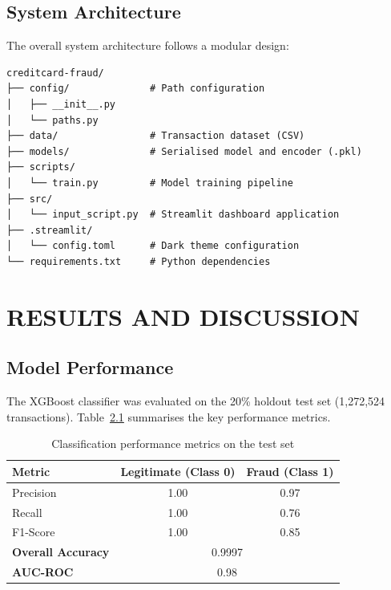 \documentclass[12pt,a4paper]{report}
\begin{document}
\section{System Architecture}

The overall system architecture follows a modular design:

\begin{verbatim}
creditcard-fraud/
├── config/              # Path configuration
│   ├── __init__.py
│   └── paths.py
├── data/                # Transaction dataset (CSV)
├── models/              # Serialised model and encoder (.pkl)
├── scripts/
│   └── train.py         # Model training pipeline
├── src/
│   └── input_script.py  # Streamlit dashboard application
├── .streamlit/
│   └── config.toml      # Dark theme configuration
└── requirements.txt     # Python dependencies
\end{verbatim}

\chapter{RESULTS AND DISCUSSION}

\section{Model Performance}

The XGBoost classifier was evaluated on the 20\% holdout test set (1,272,524 transactions). Table~\ref{tab:results} summarises the key performance metrics.

\begin{table}[h!]
\centering
\caption{Classification performance metrics on the test set}
\label{tab:results}
\begin{tabular}{@{}lcc@{}}
\toprule
\textbf{Metric} & \textbf{Legitimate (Class 0)} & \textbf{Fraud (Class 1)} \\
\midrule
Precision & 1.00 & 0.97 \\
Recall & 1.00 & 0.76 \\
F1-Score & 1.00 & 0.85 \\
\midrule
\textbf{Overall Accuracy} & \multicolumn{2}{c}{0.9997} \\
\textbf{AUC-ROC} & \multicolumn{2}{c}{0.98} \\
\bottomrule
\end{tabular}
\end{table}
\end{document}
